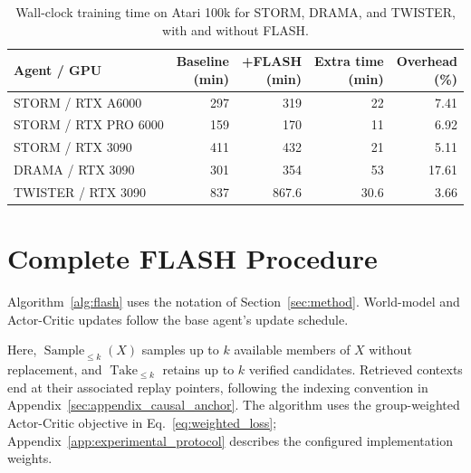 \documentclass{article} %
\begin{document}
\begin{table}[!t]
\centering
\caption{Wall-clock training time on Atari 100k for STORM, DRAMA, and TWISTER, with and without FLASH.}
\label{tab:efficiency}
\footnotesize
\setlength{\tabcolsep}{5pt}
\renewcommand{\arraystretch}{1.1}
\begin{tabular}{@{}lrrrr@{}}
\toprule
Agent / GPU & \shortstack{Baseline\\(min)}
    & \shortstack{+FLASH\\(min)}
    & \shortstack{Extra time\\(min)}
    & \shortstack{Overhead\\(\%)} \\
\midrule
STORM / RTX A6000     & 297 & 319 & 22 & 7.41 \\
STORM / RTX PRO 6000  & 159 & 170 & 11 & 6.92 \\
STORM / RTX 3090      & 411 & 432 & 21 & 5.11 \\
\midrule
DRAMA / RTX 3090      & 301 & 354 & 53 & 17.61 \\
\midrule
TWISTER / RTX 3090    & 837 & 867.6 & 30.6 & 3.66 \\
\bottomrule
\end{tabular}
\end{table}

\FloatBarrier

\onecolumn

\section{Complete FLASH Procedure}
\label{app:flash_algorithm}

Algorithm~\ref{alg:flash} uses the notation of Section~\ref{sec:method}. World-model and Actor-Critic updates follow the base agent's update schedule.

Here, $\operatorname{Sample}_{\leq k}(X)$ samples up to $k$ available members of $X$ without replacement, and $\operatorname{Take}_{\leq k}$ retains up to $k$ verified candidates. Retrieved contexts end at their associated replay pointers, following the indexing convention in Appendix~\ref{sec:appendix_causal_anchor}. The algorithm uses the group-weighted Actor-Critic objective in Eq.~\eqref{eq:weighted_loss}; Appendix~\ref{app:experimental_protocol} describes the configured implementation weights.
\end{document}
